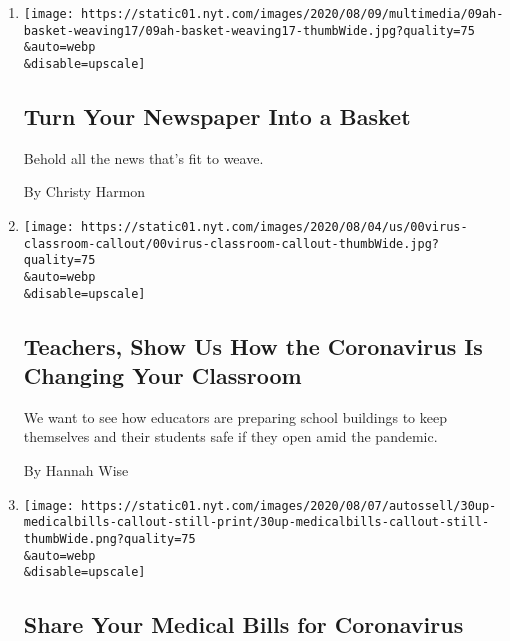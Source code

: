 \begin{enumerate}
\def\labelenumi{\arabic{enumi}.}
\item
  \href{/2020/08/08/at-home/coronavirus-newspaper-basket.html}{}

  \texttt{[image: https://static01.nyt.com/images/2020/08/09/multimedia/09ah-basket-weaving17/09ah-basket-weaving17-thumbWide.jpg?quality=75\\\&auto=webp\\\&disable=upscale]}

  \hypertarget{turn-your-newspaper-into-a-basket}{%
  \subsection{Turn Your Newspaper Into a
  Basket}\label{turn-your-newspaper-into-a-basket}}

  Behold all the news that's fit to weave.

  By Christy Harmon
\item
  \href{/2020/08/05/reader-center/teachers-show-us-how-the-coronavirus-is-changing-your-classroom.html}{}

  \texttt{[image: https://static01.nyt.com/images/2020/08/04/us/00virus-classroom-callout/00virus-classroom-callout-thumbWide.jpg?quality=75\\\&auto=webp\\\&disable=upscale]}

  \hypertarget{teachers-show-us-how-the-coronavirus-is-changing-your-classroom}{%
  \subsection{Teachers, Show Us How the Coronavirus Is Changing Your
  Classroom}\label{teachers-show-us-how-the-coronavirus-is-changing-your-classroom}}

  We want to see how educators are preparing school buildings to keep
  themselves and their students safe if they open amid the pandemic.

  By Hannah Wise
\item
  \href{/2020/08/03/reader-center/coronavirus-medical-bills.html}{}

  \texttt{[image: https://static01.nyt.com/images/2020/08/07/autossell/30up-medicalbills-callout-still-print/30up-medicalbills-callout-still-thumbWide.png?quality=75\\\&auto=webp\\\&disable=upscale]}

  \hypertarget{share-your-medical-bills-for-coronavirus}{%
  \subsection{Share Your Medical Bills for
  Coronavirus}\label{share-your-medical-bills-for-coronavirus}}


\end{enumerate}
